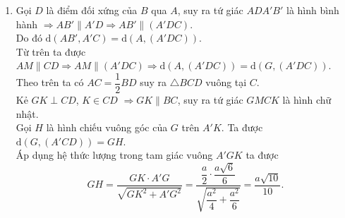 \begin{bt}
{\begin{enumerate}
	Vậy thể tích khối lăng trụ $ABC.A'B'C'$ là
	\[
	V_{ABC.A'B'C'}= \dfrac{a^2\sqrt{3}}{4} \cdot \dfrac{a\sqrt{6}}{6}= \dfrac{a^3\sqrt{2}}{8}.
	\]
	\item Gọi $D$ là điểm đối xứng của $B$ qua $A$, suy ra tứ giác $ADA'B'$ là hình bình hành $\Rightarrow AB' \parallel A'D \Rightarrow AB' \parallel (A'DC)$.\\
	Do đó $\mathrm{d} (AB', A'C)= \mathrm{d} (A, (A'DC))$.\\
	Từ trên ta được $AM \parallel CD \Rightarrow AM \parallel (A'DC) \Rightarrow \mathrm{d} (A, (A'DC))= \mathrm{d}(G, (A'DC))$.\\
	Theo trên ta có $AC= \dfrac{1}{2}{BD}$ suy ra $\triangle BCD$ vuông tại $C$.\\
	Kẻ $GK \perp CD$, $K \in CD$ $\Rightarrow GK \parallel BC$, suy ra tứ giác $GMCK$ là hình chữ nhật.\\
	Gọi $H$ là hình chiếu vuông góc của $G$ trên $A'K$. Ta được $\mathrm{d}(G, (A'CD))=GH$.\\
	Áp dụng hệ thức lượng trong tam giác vuông $A'GK$ ta được
	\[
	GH= \dfrac{GK \cdot A'G}{\sqrt{GK^2+A'G^2}} = \dfrac{\dfrac{a}{2} \cdot \dfrac{a\sqrt{6}}{6}}{\sqrt{\dfrac{a^2}{4}+\dfrac{a^2}{6}}}= \dfrac{a\sqrt{10}}{10}.
	\]
\end{enumerate}
}
\end{bt}

